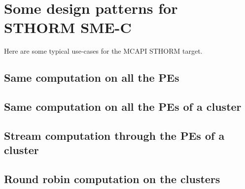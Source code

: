 \documentclass[a4paper]{article}
\begin{document}
\section{Some design patterns for STHORM SME-C}
\label{sec:examples}

Here are some typical use-cases for the MCAPI STHORM target.


\subsection{Same computation on all the PEs}
\label{sec:same-computation-all}




\subsection{Same computation on all the PEs of a cluster}
\label{sec:same-computation-all-2}




\subsection{Stream computation through the PEs of a cluster}
\label{sec:stre-comp-thro}




\subsection{Round robin computation on the clusters}
\label{sec:round-robin-comp}




%
\end{document}

